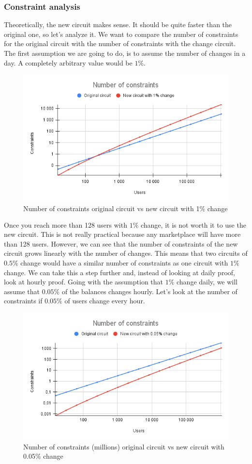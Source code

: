 \subsubsection{Constraint analysis}
Theoretically, the new circuit makes sense. It should be quite faster than the original one, so let's analyze it.
We want to compare the number of constraints for the original circuit with the number of constraints with the change circuit.
The first assumption we are going to do, is to assume the number of changes in a day. A completely arbitrary value would be $1\%$.
\begin{figure}[H]
   \centering
   \includegraphics[width=130mm]{Number of constraints.png}
   \caption{Number of constraints original circuit vs new circuit with 1\% change}
   \label{overflow}
   \end{figure}
Once you reach more than 128 users with $1\%$ change, it is not worth it to use the new circuit.
This is not really practical because any marketplace will have more than 128 users.
However, we can see that the number of constraints of the new circuit grows linearly with the number of changes.
This means that two circuits of $0.5\%$ change would have a similar number of constraints as one circuit with $1\%$ change.
We can take this a step further and, instead of looking at daily proof, look at hourly proof.
Going with the assumption that $1\%$ change daily, we will assume that $0.05\%$ of the balances changes hourly.
Let's look at the number of constraints if $0.05\%$ of users change every hour.
\begin{figure}[H]
   \centering
   \includegraphics[width=130mm]{Number of constraints .05.png}
   \caption{Number of constraints (millions) original circuit vs new circuit with 0.05\% change}
   \label{overflow}
   \end{figure}
